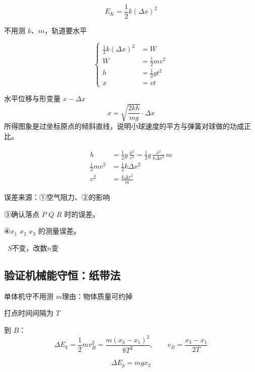 \[ E_K=\frac12 k(\Delta x)^2 \]

不用测 $k$、$m$，轨道要水平


\[
\left\{\begin{aligned}
\tfrac12 k(\Delta x)^2&=W\\
W&=\tfrac12 mv^2\\
h&=\tfrac12 gt^2\\
x&=vt
\end{aligned}\right.
\]

水平位移与形变量 $x-\Delta x$
\[ x=\sqrt{\frac{2kh}{mg}}\cdot\Delta x \]
所得图象是过坐标原点的倾斜直线，说明小球速度的平方与弹簧对球做的功成正比。

\begin{align*}
h&=\frac12 g\,\frac{x^2}{v^2}=\frac12 g\,\frac{x^2}{k\Delta x^2}\,m\\
\frac12 mv^2&=\frac12 k\Delta x^2\\
v^2&=\frac{k\Delta x^2}{m}
\end{align*}

误差来源：①空气阻力、②的影响

③确认落点 $P$ $Q$ $R$ 时的误差。 %

④$x_1$ $x_2$ $x_3$ 的测量误差。

\ $S$不变，改数$n$变 %

\subsection{验证机械能守恒：纸带法}
单体机守不用测 $m$\quad 理由：物体质量可约掉


打点时间间隔为 $T$

到 $B$：
\[ \Delta E_k=\frac12 mv_B^2=\frac{m(x_3-x_1)^2}{8T^2},\qquad v_B=\frac{x_3-x_1}{2T} \]


\[ \Delta E_p=mgx_2 \]

